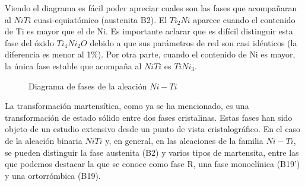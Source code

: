 \documentclass[12pt]{article}
\theoremstyle{definition}
\theoremstyle{remark}
\begin{document}
Viendo el diagrama es fácil poder apreciar cuales son las fases que acompañaran al $NiTi$ cuasi-equiatómico (austenita B2). El $Ti_2Ni$ aparece cuando el contenido de Ti es mayor que el de Ni. Es importante aclarar que es difícil distinguir esta fase del óxido $Ti_4Ni_2O$ debido a que sus parámetros de red son casi idénticos (la diferencia es menor al 1\%). Por otra parte, cuando el contenido de Ni es mayor, la única fase estable que acompaña al $NiTi$ es $TiNi_3$.

\begin{figure}[H]
	\centering
	\caption{Diagrama de fases de la aleación $Ni-Ti$}
	\label{PhaseDiagram}
\end{figure}

La transformación martensítica, como ya se ha mencionado, es una transformación de estado sólido entre dos fases cristalinas. Estas fases han sido objeto de un estudio extensivo desde un punto de vista cristalográfico. En el caso de la aleación binaria $NiTi$ y, en general, en las aleaciones de la familia $Ni-Ti$, se pueden distinguir la fase austenita (B2) y varios tipos de martensita, entre las que podemos destacar la que se conoce como fase R, una fase monoclínica (B19’) y una ortorrómbica (B19).
\end{document}
